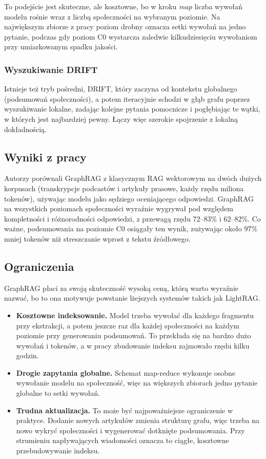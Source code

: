 \documentclass[11pt,a4paper]{article}
\begin{document}
To podejście jest skuteczne, ale kosztowne, bo w kroku \textit{map} liczba wywołań modelu
rośnie wraz z liczbą społeczności na wybranym poziomie. Na największym zbiorze z pracy
poziom drobny oznacza setki wywołań na jedno pytanie, podczas gdy poziom C0 wystarcza zaledwie
kilkudziesięciu wywołaniom przy umiarkowanym spadku jakości.

\subsubsection{Wyszukiwanie DRIFT}

Istnieje też tryb pośredni, DRIFT, który zaczyna od kontekstu globalnego (podsumowań
społeczności), a potem iteracyjnie schodzi w głąb grafu poprzez wyszukiwanie lokalne,
zadając kolejne pytania pomocnicze i pogłębiając te wątki, w których jest najbardziej pewny.
Łączy więc szerokie spojrzenie z lokalną dokładnością.

\subsection{Wyniki z pracy}

Autorzy porównali GraphRAG z klasycznym RAG wektorowym na dwóch dużych korpusach (transkrypcje
podcastów i artykuły prasowe, każdy rzędu miliona tokenów), używając modelu jako sędziego
oceniającego odpowiedzi. GraphRAG na wszystkich poziomach społeczności wyraźnie wygrywał pod
względem kompletności i różnorodności odpowiedzi, z przewagą rzędu 72--83\% i 62--82\%. Co
ważne, podsumowania na poziomie C0 osiągały ten wynik, zużywając około 97\% mniej tokenów niż
streszczanie wprost z tekstu źródłowego.

\subsection{Ograniczenia}

GraphRAG płaci za swoją skuteczność wysoką ceną, którą warto wyraźnie nazwać, bo to ona
motywuje powstanie lżejszych systemów takich jak LightRAG.

\begin{itemize}[itemsep=3pt]
  \item \textbf{Kosztowne indeksowanie.} Model trzeba wywołać dla każdego fragmentu przy
        ekstrakcji, a potem jeszcze raz dla każdej społeczności na każdym poziomie przy
        generowaniu podsumowań. To przekłada się na bardzo dużo wywołań i tokenów, a w pracy
        zbudowanie indeksu zajmowało rzędu kilku godzin.
  \item \textbf{Drogie zapytania globalne.} Schemat map-reduce wykonuje osobne wywołanie
        modelu na społeczność, więc na większych zbiorach jedno pytanie globalne to setki
        wywołań.
  \item \textbf{Trudna aktualizacja.} To może być najpoważniejsze ograniczenie w praktyce.
        Dodanie nowych artykułów zmienia strukturę grafu, więc trzeba na nowo wykryć
        społeczności i wygenerować dotknięte podsumowania. Przy strumieniu napływających
        wiadomości oznacza to ciągłe, kosztowne przebudowywanie indeksu.
\end{itemize}
\end{document}
